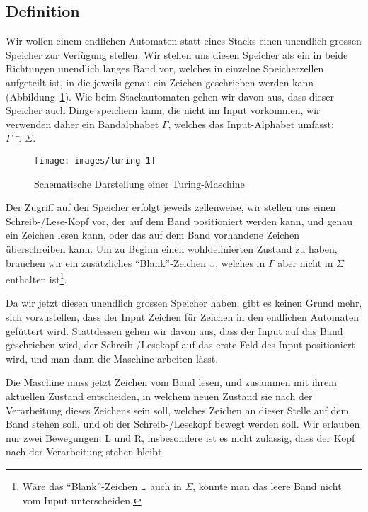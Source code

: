 \subsection{Definition}
Wir wollen einem endlichen Automaten statt eines Stacks einen unendlich
grossen Speicher zur Verfügung stellen. Wir stellen uns diesen
Speicher als ein in beide Richtungen unendlich langes Band vor,
welches in einzelne Speicherzellen aufgeteilt ist, in die jeweils
genau ein Zeichen geschrieben werden kann (Abbildung~\ref{turingfig}).
Wie beim Stackautomaten gehen
wir davon aus, dass dieser Speicher auch Dinge speichern kann, die nicht
im Input vorkommen, wir verwenden daher ein Bandalphabet $\Gamma$, welches
das Input-Alphabet umfasst: $\Gamma\supset \Sigma$.

\begin{figure}
\begin{center}
\texttt{[image: images/turing-1]}
\end{center}
\caption{Schematische Darstellung einer Turing-Maschine\label{turingfig}}
\end{figure}

Der Zugriff auf den Speicher erfolgt jeweils zellenweise, wir stellen
uns einen Schreib-/Lese-Kopf vor, der auf dem Band positioniert werden
kann, und genau ein Zeichen lesen kann, oder das auf dem Band vorhandene
Zeichen überschreiben kann. Um zu Beginn einen wohldefinierten Zustand
zu haben, brauchen wir ein zusätzliches ``Blank''-Zeichen $\blank$,
welches in $\Gamma$ aber nicht in $\Sigma$ enthalten ist\footnote{Wäre
das ``Blank''-Zeichen $\blank$ auch in $\Sigma$, könnte man das
leere Band nicht vom Input unterscheiden.}.

Da wir jetzt diesen unendlich grossen Speicher haben, gibt es keinen
Grund mehr, sich vorzustellen, dass der Input Zeichen für Zeichen
in den endlichen Automaten gefüttert wird. Stattdessen gehen wir
davon aus, dass der Input auf das Band geschrieben wird, der
Schreib-/Lesekopf auf das erste Feld des Input positioniert wird,
und man dann die Maschine arbeiten lässt.

Die Maschine muss jetzt Zeichen vom Band lesen, und zusammen mit
ihrem aktuellen Zustand entscheiden, in welchem neuen Zustand
sie nach der Verarbeitung dieses Zeichens sein soll, welches Zeichen
an dieser Stelle auf dem Band stehen soll, und ob der Schreib-/Lesekopf
bewegt werden soll. Wir erlauben nur zwei Bewegungen: L und R, insbesondere
ist es nicht zulässig, dass der Kopf nach der Verarbeitung stehen
bleibt.

